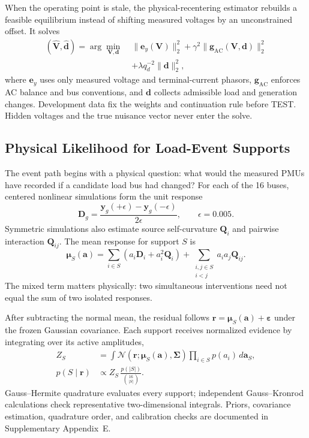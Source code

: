 When the operating point is stale, the physical-recentering estimator rebuilds a feasible equilibrium instead of shifting measured voltages by an unconstrained offset. It solves
\begin{equation}
 \begin{aligned}
 (\widehat{\bm V},\widehat{\bm d})
 =\arg\min_{\bm V,\bm d}\; &\|\bm e_y(\bm V)\|_2^2
 +\gamma^2\|\bm g_{\mathrm{AC}}(\bm V,\bm d)\|_2^2\\[-1mm]
 &+\lambda q_d^{-2}\|\bm d\|_2^2,
 \end{aligned}
 \label{eq:e06h-map}
\end{equation}
where $\bm e_y$ uses only measured voltage and terminal-current phasors, $\bm g_{\mathrm{AC}}$ enforces AC balance and bus conventions, and $\bm d$ collects admissible load and generation changes. Development data fix the weights and continuation rule before TEST. Hidden voltages and the true nuisance vector never enter the solve.

\subsection{Physical Likelihood for Load-Event Supports}
\label{sec:load-event-inference}

The event path begins with a physical question: what would the measured PMUs have recorded if a candidate load bus had changed? For each of the 16 buses, centered nonlinear simulations form the unit response
\begin{equation}
 \bm D_g=\frac{\bm y_g(+\epsilon)-\bm y_g(-\epsilon)}{2\epsilon},
 \qquad \epsilon=0.005.
 \label{eq:load-tangent}
\end{equation}
Symmetric simulations also estimate source self-curvature $\bm Q_i$ and pairwise interaction $\bm Q_{ij}$. The mean response for support $S$ is
\begin{equation}
 \bm\mu_S(\bm a)=\sum_{i\in S}(a_i\bm D_i+a_i^2\bm Q_i)
 +\sum_{\substack{i,j\in S\\i<j}}a_ia_j\bm Q_{ij}.
 \label{eq:load-multi-source-mean}
\end{equation}
The mixed term matters physically: two simultaneous interventions need not equal the sum of two isolated responses.

After subtracting the normal mean, the residual follows
$\bm r=\bm\mu_S(\bm a)+\bm\varepsilon$ under the frozen Gaussian covariance. Each support receives normalized evidence by integrating over its active amplitudes,
\begin{align}
 Z_S&=\int \mathcal N(\bm r;\bm\mu_S(\bm a),\bm\Sigma)
 \prod_{i\in S}p(a_i)\,d\bm a_S,\nonumber\\
 p(S\mid\bm r)&\propto Z_S\,\frac{p(|S|)}{\binom{16}{|S|}}.
 \label{eq:load-support-posterior}
\end{align}
Gauss--Hermite quadrature evaluates every support; independent Gauss--Kronrod calculations check representative two-dimensional integrals. Priors, covariance estimation, quadrature order, and calibration checks are documented in Supplementary Appendix~E.

